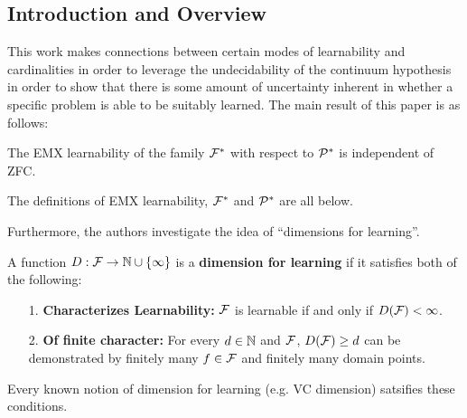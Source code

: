 \documentclass[12pt]{article}
\begin{document}
\subsection{Introduction and Overview}
This work makes connections between certain modes of learnability and cardinalities in order to leverage the undecidability of the continuum hypothesis in order to show that 
there is some amount of uncertainty inherent in whether a specific problem is able to be suitably learned. The main result of this paper is as follows:
\begin{thm}[BHMSY 19]
	The EMX learnability of the family $\mathcal{F}^\ast$ with respect to $\mathcal{P}^\ast$ is independent of ZFC.
\end{thm}
\begin{rmk}
	The definitions of EMX learnability, $\mathcal{F}^\ast$ and $\mathcal{P}^\ast$ are all below.
\end{rmk}

Furthermore, the authors investigate the idea of ``dimensions for learning''. 
\begin{defn}
	A function $D:\mathcal{F}\to\mathbb{N}\cup\{\infty\}$ is a \textbf{dimension for learning} if it satisfies both of the following:
	\begin{enumerate}
		\item[1.] \textbf{Characterizes Learnability:} $\mathcal{F}$ is learnable if and only if $D(\mathcal{F})<\infty$.
		\item[2.] \textbf{Of finite character:} For every $d\in\mathbb{N}$ and $\mathcal{F}$, $D(\mathcal{F})\ge d$ can be demonstrated by finitely many $f\in\mathcal{F}$ and finitely many domain points.  
	\end{enumerate}
\end{defn}
\begin{rmk}
	Every known notion of dimension for learning (e.g. VC dimension) satsifies these conditions.
\end{rmk}
\end{document}

